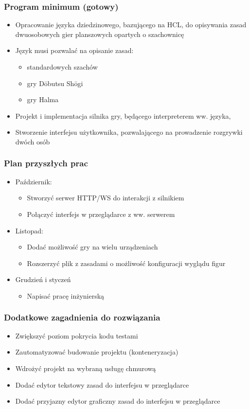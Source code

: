 \documentclass{beamer}
\begin{document}
\begin{frame}
	\frametitle{Program minimum (gotowy)}
	\begin{itemize}
		\item Opracowanie języka dziedzinowego, bazującego na HCL, do opisywania zasad dwuosobowych gier planszowych opartych o szachownicę
		\item Język musi pozwalać na opisanie zasad:
		      \begin{itemize}
			      \item standardowych szachów
			      \item gry Dōbutsu Shōgi
			      \item gry Halma
		      \end{itemize}
		\item Projekt i implementacja silnika gry, będącego interpreterem ww. języka,
		\item Stworzenie interfejsu użytkownika, pozwalającego na prowadzenie rozgrywki dwóch osób
	\end{itemize}
\end{frame}

\begin{frame}
	\frametitle{Plan przyszłych prac}
	\begin{itemize}
		\item Październik:
		      \begin{itemize}
			      \item Stworzyć serwer HTTP/WS do interakcji z silnikiem
			      \item Połączyć interfejs w przeglądarce z ww. serwerem
		      \end{itemize}
		\item Listopad:
		      \begin{itemize}
			      \item Dodać możliwość gry na wielu urządzeniach
			      \item Rozszerzyć plik z zasadami o możliwość konfiguracji wyglądu figur
		      \end{itemize}
		\item Grudzień i styczeń
		      \begin{itemize}
			      \item Napisać pracę inżynierską
		      \end{itemize}
	\end{itemize}
\end{frame}

\begin{frame}
	\frametitle{Dodatkowe zagadnienia do rozwiązania}
	\begin{itemize}
		\item Zwiększyć poziom pokrycia kodu testami
		\item Zautomatyzować budowanie projektu (konteneryzacja)
		\item Wdrożyć projekt na wybraną usługę chmurową
		\item Dodać edytor tekstowy zasad do interfejsu w przeglądarce
		\item Dodać przyjazny edytor graficzny zasad do interfejsu w przeglądarce
	\end{itemize}
\end{frame}
\end{document}

